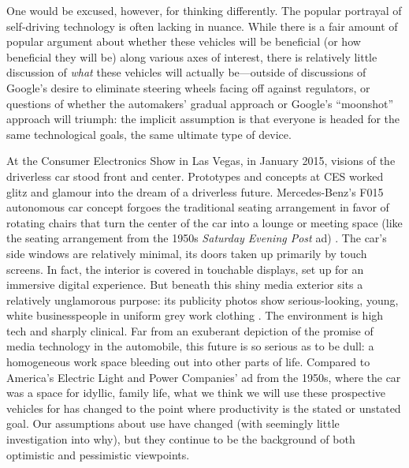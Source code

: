 

One would be excused, however, for thinking differently. The popular
portrayal of self-driving technology is often lacking in nuance. While
there is a fair amount of popular argument about whether these
vehicles will be beneficial (or how beneficial they will be) along
various axes of interest, there is relatively little discussion of
\emph{what} these vehicles will actually be---outside of discussions of
Google's desire to eliminate steering wheels facing off against
regulators, or questions of whether the automakers' gradual approach
or Google's ``moonshot'' approach will triumph: the implicit
assumption is that everyone is headed for the same technological
goals, the same ultimate type of device.

At the Consumer Electronics Show in Las Vegas, in January
2015, visions of the driverless car stood front and center. Prototypes
and concepts at CES worked glitz and glamour into the dream of a
driverless future. Mercedes-Benz's F015 autonomous car
concept forgoes the traditional seating arrangement in favor of
rotating chairs that turn the center of the car into a lounge or
meeting space (like the seating arrangement from the 1950s
\emph{Saturday Evening Post} ad) \cite{riofrioMB}. The car's side windows are relatively minimal, its
doors taken up primarily by touch screens. In fact, the interior is
covered in touchable displays, set up for an immersive digital
experience. But beneath this shiny media exterior sits a relatively
unglamorous purpose:  its publicity photos show serious-looking, young, white
businesspeople in uniform grey work clothing \cite{simpsonDesign}. The environment is
high tech and sharply clinical. Far from an exuberant depiction of the
promise of media technology in the automobile, this future is so
serious as to be dull: a homogeneous work space bleeding out into
other parts of life. Compared to America's Electric Light and Power
Companies' ad from the 1950s, where the car was a space for idyllic,
family life, what we think we will use these prospective vehicles for
has changed to the point where productivity is the stated or unstated
goal. Our assumptions about use have changed (with seemingly little
investigation into why), but they continue to be the background of both
optimistic and pessimistic viewpoints.

